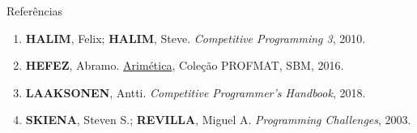\begin{frame}[fragile]{Referências}

    \begin{enumerate}

        \item \textbf{HALIM}, Felix; \textbf{HALIM}, Steve. \textit{Competitive Programming 3}, 2010.

        \item \textbf{HEFEZ}, Abramo. \href{https://loja.sbm.org.br/index.php/aritmetica.html}{Arimética}, Coleção PROFMAT, SBM, 2016.

        \item \textbf{LAAKSONEN}, Antti. \textit{Competitive Programmer's Handbook}, 2018.

        \item \textbf{SKIENA}, Steven S.; \textbf{REVILLA}, Miguel A. \textit{Programming Challenges}, 2003.
    \end{enumerate}

\end{frame}
